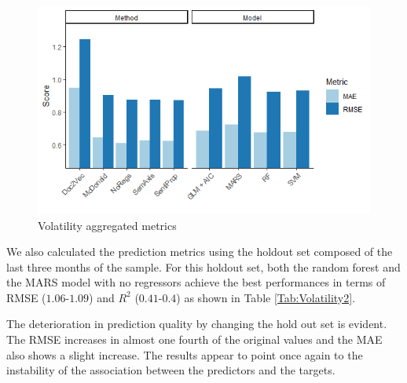 \documentclass[a4paper, 12pt]{report}
\begin{document}
    \begin{figure}[H]
    \centering
    \includegraphics[scale = 0.7]{graphs/Vol_Agg.png}
    \caption{Volatility aggregated metrics}
    \label{Fig:volagg}
    \end{figure}
        
    
    We also calculated the prediction metrics using the holdout set composed of the last three months of the sample. For this holdout set, both the random forest and the MARS model with no regressors achieve the best performances in terms of RMSE ($1.06$-$1.09$) and $R^2$ ($0.41$-$0.4$) as shown in Table \ref{Tab:Volatility2}.
    
    The deterioration in prediction quality by changing the hold out set is evident. The RMSE increases in almost one fourth of the original values and the MAE also shows a slight increase.  The results appear to point once again to the instability of the association between the predictors and the targets. 
    
\end{document}
